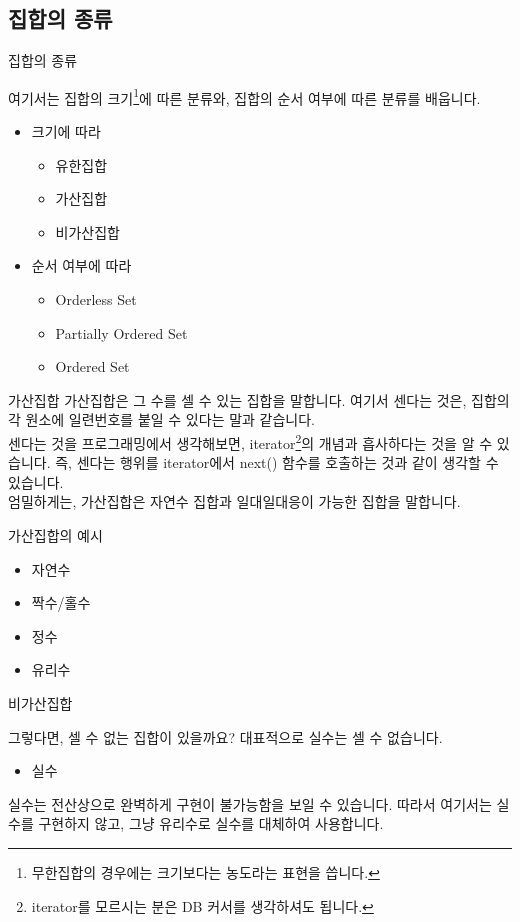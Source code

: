\documentclass{beamer}
\begin{document}
\subsection{집합의 종류} 
\begin{frame}{집합의 종류}

여기서는 집합의 크기\footnote{무한집합의 경우에는 크기보다는 농도라는 표현을 씁니다.}에 따른 분류와, 집합의 순서 여부에 따른 분류를 배웁니다. 
\begin{itemize}
\item 크기에 따라 
\begin{itemize} 
\item 유한집합 
\item 가산집합
\item 비가산집합 
\end{itemize}

\item 순서 여부에 따라 
\begin{itemize}
\item Orderless Set 
\item Partially Ordered Set 
\item Ordered Set
\end{itemize}
\end{itemize}
\end{frame}



\begin{frame}{가산집합}
가산집합은 그 수를 셀 수 있는 집합을 말합니다. 여기서 센다는 것은, 집합의 각 원소에 일련번호를 붙일 수 있다는 말과 같습니다. 
\\
센다는 것을 프로그래밍에서 생각해보면, iterator\footnote{iterator를 모르시는 분은 DB 커서를 생각하셔도 됩니다.}의 개념과 흡사하다는 것을 알 수 있습니다. 즉, 센다는 행위를 iterator에서 next() 함수를 호출하는 것과 같이 생각할 수 있습니다. \\
엄밀하게는, 가산집합은 자연수 집합과 일대일대응이 가능한 집합을 말합니다. 
\end{frame}


\begin{frame}{가산집합의 예시}
\begin{itemize}
\item 자연수
\item 짝수/홀수
\item 정수
\item 유리수 
\end{itemize}
\end{frame}

\begin{frame}{비가산집합}

그렇다면, 셀 수 없는 집합이 있을까요? 대표적으로 실수는 셀 수 없습니다. 
\begin{itemize}
\item 실수
\end{itemize}
실수는 전산상으로 완벽하게 구현이 불가능함을 보일 수 있습니다. 따라서 여기서는 실수를 구현하지 않고, 그냥 유리수로 실수를 대체하여 사용합니다. 
\end{frame}
\end{document}
